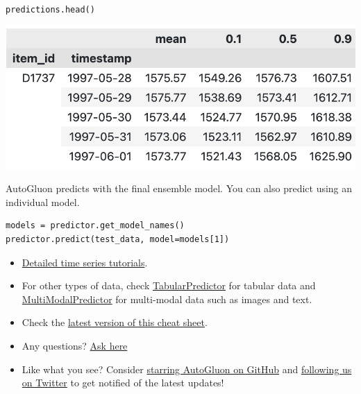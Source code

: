 \begin{verbatim}
predictions.head()
\end{verbatim}

\begin{center}
\includegraphics[width=\linewidth]{timeseries/images/predictions.png}
\end{center}

\medskip

AutoGluon predicts with the final ensemble model. You can also predict using an individual model. 

\begin{verbatim}
models = predictor.get_model_names()
predictor.predict(test_data, model=models[1])
\end{verbatim}




\begin{itemize}
  \item \href{https://auto.gluon.ai/stable/tutorials/timeseries/index.html}{Detailed  time series tutorials}.
  \item For other types of data, check
  \href{https://auto.gluon.ai/stable/tutorials/tabular/index.html}{TabularPredictor} for tabular data and 
  \href{https://auto.gluon.ai/stable/tutorials/multimodal/index.html}{MultiModalPredictor} for multi-modal data such as images and text. 
  \item Check the \href{https://auto.gluon.ai/stable/cheatsheet.html}{latest version of this cheat sheet}.
  \item Any questions? \href{https://github.com/autogluon/autogluon/discussions}{Ask here}
  \item Like what you see? Consider \href{https://github.com/autogluon/autogluon/stargazers}{starring AutoGluon on GitHub} and \href{https://twitter.com/autogluon}{following us on Twitter} to get notified of the latest updates!
\end{itemize}


\raggedcolumns


